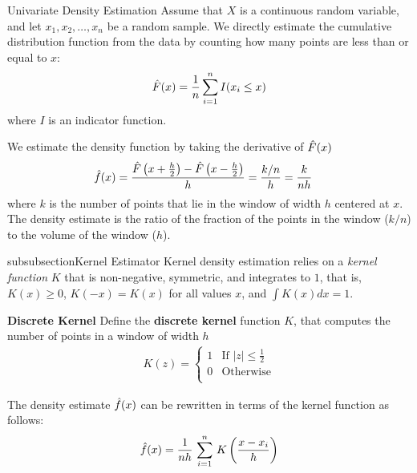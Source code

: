 \begin{frame}{Univariate Density Estimation}
Assume that $X$ is a continuous random variable, and let $x_1, x_2,
\ldots, x_n$ be a random sample.
We directly estimate the cumulative distribution function
from the data by counting how many points are less than or equal
to $x$:
\begin{align*}
  \hat{F}(x)= {1\over n}  \sum_{i=1}^n I(x_i \leq x)
\end{align*}
where $I$ is an indicator function.

\medskip
We 
estimate the density function by taking the derivative of $\hat{F}(x)$
\begin{align*}
  \kern3pt\hat{\kern-3pt f}(x) & =
  \frac{\hat{F}\left(x+\frac{h}{2}\right)-\hat{F}\left(x-\frac{h}{2}\right)}{h}
  = {{k/n} \over h} = {k \over nh}
\end{align*}
where $k$
is the number of points
that lie in the window of width $h$ centered at $x$.
The density estimate is the ratio of the
fraction of the points in the window ($k/n$) to the volume of the window
($h$). 
\end{frame}


\begin{frame}subsubsection{Kernel Estimator}
Kernel density estimation relies on a {\em kernel
function} $K$
that is non-negative, symmetric, and integrates to $1$,
that is, $K(x) \ge 0$, $K(-x) = K(x)$
for all values $x$, and
${\int K(x) dx = 1}$.

\medskip
{\bf Discrete Kernel}
Define the {\bf discrete kernel} function $K$, that
computes the number of points
in a window of width $h$
\begin{align*}
  K(z) = \begin{cases}
    1 & \mbox{If $|z| \leq \frac{1}{2}$}\\
    0 & \mbox{Otherwise}\\
  \end{cases}
\end{align*}

The density estimate $\kern3pt\hat{\kern-3pt f}(x)$ can
be rewritten in terms
of the kernel function as follows:
\begin{align*}
    \kern3pt\hat{\kern-3pt f}(x) =  \frac{1}{nh}\,\sum_{i=1}^n\,
    K \left(\frac{x-x_i}{h}\right)
\end{align*}
\end{frame}



